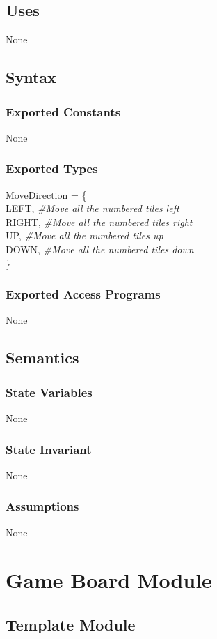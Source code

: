 \documentclass[12pt]{article}
\begin{document}
\subsection* {Uses}
None
\subsection* {Syntax}
\subsubsection* {Exported Constants}
None
\subsubsection* {Exported Types}
MoveDirection = \{\\
    LEFT, \textit{\#Move all the numbered tiles left}\\
    RIGHT, \textit{\#Move all the numbered tiles right}\\
    UP, \textit{\#Move all the numbered tiles up}\\
    DOWN, \textit{\#Move all the numbered tiles down}\\
\}
\subsubsection* {Exported Access Programs}
None
\subsection* {Semantics}
\subsubsection* {State Variables}
None
\subsubsection* {State Invariant}
None
\subsubsection* {Assumptions}
None
\newpage




\section* {Game Board Module}

\subsection*{Template Module}
\end{document}
